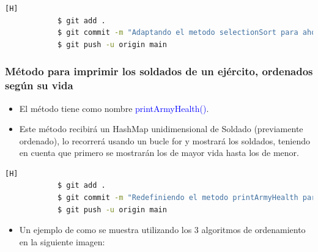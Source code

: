 \documentclass{article}
\begin{document}
        

        \begin{lstlisting}[language=bash,caption={Commit \href{https://github.com/hernanchoquehuanca/fp2-23b/commit/4fdc5dfbea940b0655be4e44b4cdce5b992c34dc}{4fdc5df}: Se agregó el método que contiene el algoritmo de ordenamiento selectionSort, reutilizándola del laboratorio anterior y adaptándola a los nuevos ejércitos en HashMap}][H]
    		$ git add .
    		$ git commit -m "Adaptando el metodo selectionSort para ahora trabajar con HashMap, cambiando el parametro del mismo y adaptando el metodo para colocar valores dentro del HashMap"
    		$ git push -u origin main
    	\end{lstlisting}
        
\newpage
        \subsubsection{Método para imprimir los soldados de un ejército, ordenados según su vida}
        
        \begin{itemize}
            \item El método tiene como nombre \textcolor{blue}{printArmyHealth()}.
            \item Este método recibirá un HashMap unidimensional de Soldado (previamente ordenado), lo recorrerá usando un bucle for y mostrará los soldados, teniendo en cuenta que primero se mostrarán los de mayor vida hasta los de menor.
        \end{itemize}
        
        

        \begin{lstlisting}[language=bash,caption={Commit \href{https://github.com/hernanchoquehuanca/fp2-23b/commit/a08c08765eda919b4a65ead07a2e215f09b756fd}{a08c087}: Se implementaró el método printArmyHealth}][H]
    		$ git add .
    		$ git commit -m "Redefiniendo el metodo printArmyHealth para ahora trabajar con HashMap, cambiando solamente el parametro del mismo)"	
    		$ git push -u origin main
    	\end{lstlisting}
        \begin{itemize}
            \begin{itemize}
                \item Un ejemplo de como se muestra utilizando los 3 algoritmos de ordenamiento en la siguiente imagen:
            \end{itemize}
        \end{itemize}
\end{document}
